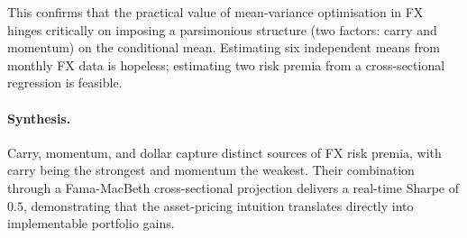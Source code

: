 \documentclass[a4paper,12pt]{article}
\begin{document}
This confirms that the practical value of mean-variance optimisation in FX hinges critically
on imposing a parsimonious structure (two factors: carry and momentum) on the conditional
mean. Estimating six independent means from monthly FX data is hopeless; estimating two
risk premia from a cross-sectional regression is feasible.

\paragraph{Synthesis.}
Carry, momentum, and dollar capture distinct sources of FX risk premia, with carry being
the strongest and momentum the weakest. Their combination through a Fama-MacBeth
cross-sectional projection delivers a real-time Sharpe of $0.5$, demonstrating that the
asset-pricing intuition translates directly into implementable portfolio gains.
\end{document}

